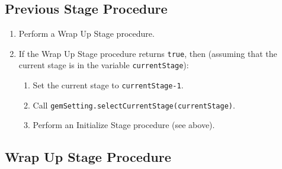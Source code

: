 \documentclass[11pt]{article}
\begin{document}
\subsection{Previous Stage Procedure}

\begin{enumerate}
\item Perform a Wrap Up Stage procedure.
\item If the Wrap Up Stage procedure returns {\tt true}, then (assuming
  that the current stage is in the variable {\tt currentStage}):
  \begin{enumerate}
  \item Set the current stage to \verb/currentStage-1/.
  \item Call {\tt gemSetting.selectCurrentStage(currentStage)}.
  \item Perform an Initialize Stage procedure (see above).
  \end{enumerate}
\end{enumerate}

\subsection{Wrap Up Stage Procedure}
\end{document}
